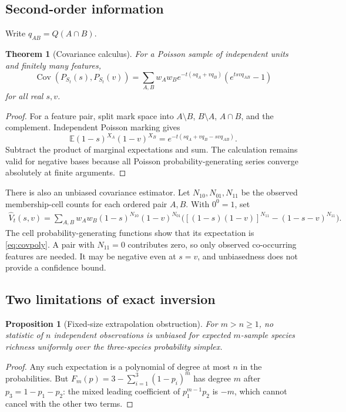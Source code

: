 \documentclass[11pt]{article}
\numberwithin{equation}{section}
\newtheorem{theorem}{Theorem}[section]
\newtheorem{proposition}[proposition]{Proposition}
\theoremstyle{definition}
\theoremstyle{remark}
\newcommand{\E}{\mathbb E}
\newcommand{\Cov}{\operatorname{Cov}}
\begin{document}
\subsection{Second-order information}
Write $q_{AB}=Q(A\cap B)$.
\begin{theorem}[Covariance calculus]\label{thm:covariance}
For a Poisson sample of independent units and finitely many features,
\begin{equation}\label{eq:covpoly}
 \Cov(P_{S_t}(s),P_{S_t}(v))
 =\sum_{A,B}w_Aw_B e^{-t(sq_A+vq_B)}(e^{tsv q_{AB}}-1)
\end{equation}
for all real $s,v$.
\end{theorem}
\begin{proof}
For a feature pair, split mark space into $A\setminus B$, $B\setminus A$, $A\cap B$, and the complement. Independent Poisson marking gives
\[
 \E(1-s)^{X_A}(1-v)^{X_B}=e^{-t(sq_A+vq_B-sv q_{AB})}.
\]
Subtract the product of marginal expectations and sum. The calculation remains valid for negative bases because all Poisson probability-generating series converge absolutely at finite arguments.
\end{proof}
There is also an unbiased covariance estimator. Let $N_{10},N_{01},N_{11}$ be the observed membership-cell counts for each ordered pair $A,B$. With $0^0=1$, set
\begin{align}\label{eq:covestimate}
 \widehat V_t(s,v)=\sum_{A,B}w_Aw_B(1-s)^{N_{10}}(1-v)^{N_{01}}
 \bigl( [(1-s)(1-v)]^{N_{11}}-(1-s-v)^{N_{11}}\bigr).
\end{align}
The cell probability-generating functions show that its expectation is \eqref{eq:covpoly}. A pair with $N_{11}=0$ contributes zero, so only observed co-occurring features are needed. It may be negative even at $s=v$, and unbiasedness does not provide a confidence bound.

\subsection{Two limitations of exact inversion}
\begin{proposition}[Fixed-size extrapolation obstruction]\label{prop:fixedobstruction}
For $m>n\ge1$, no statistic of $n$ independent observations is unbiased for expected $m$-sample species richness uniformly over the three-species probability simplex.
\end{proposition}
\begin{proof}
Any such expectation is a polynomial of degree at most $n$ in the probabilities. But $F_m(p)=3-\sum_{i=1}^3(1-p_i)^m$ has degree $m$ after $p_3=1-p_1-p_2$: the mixed leading coefficient of $p_1^{m-1}p_2$ is $-m$, which cannot cancel with the other two terms.
\end{proof}
\end{document}
